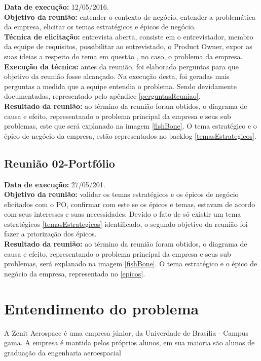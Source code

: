 \indent \textbf{Data de execução:} 12/05/2016.\\
\indent \textbf{Objetivo da reunião:} entender o contexto de negócio, entender a problemática da empresa, elicitar os temas estratégicos e épicos de negócio.\\
\indent \textbf{Técnica de elicitação:} entrevista aberta, consiste em o entrevistador, membro da equipe de requisitos, possibilitar ao entrevistado, o Product Owner, expor as suas ideias a respeito do tema em questão \cite{leffingwell2011}, no caso, o problema da empresa.\\
\indent \textbf{Execução da técnica:} antes da reunião, foi elaborada perguntas para que objetivo da reunião fosse alcançado. Na execução desta, foi geradas mais perguntas a medida que a equipe entendia o problema. Sendo devidamente documentadas, representado pelo apêndice \ref{perguntasReuniao}.\\
\indent \textbf{Resultado da reunião:} ao término da reunião foram obtidos, o diagrama de causa e efeito, representando o problema principal da empresa e seus sub problemas, este que será explanado na imagem \ref{fishBone}. O tema estratégico e o épico de negócio da empresa, estão representados no backlog \ref{temasEstrategicos}.\\

\subsection{Reunião 02-Portfólio}\label{Reunião02-Portfólio}

\indent \textbf{Data de execução:} 27/05/201.\\
\indent \textbf{Objetivo da reunião:} validar os temas estratégicos e os épicos de negócio elicitados com o PO, confirmar com este se os épicos e temas, estavam de acordo com seus interesses e suas necessidades. Devido o fato de só existir um tema estratégicos \ref{temasEstrategicos} identificado, o segundo objetivo da reunião foi fazer a priorização dos épicos.\\
\indent \textbf{Resultado da reunião:} ao término da reunião foram obtidos, o diagrama de causa e efeito, representando o problema principal da empresa e seus sub problemas, será explanado na imagem \ref{fishBone}. O tema estratégico e o épico de negócio da empresa, representado no \ref{epicos}.\\

\section{Entendimento do problema}
A Zenit Aerospace é uma empresa júnior, da Univerdade de Brasília - Campus gama. A empresa é mantida pelos próprios alunos, em sua maioria são alunos de graduação da engenharia aeroespacial

